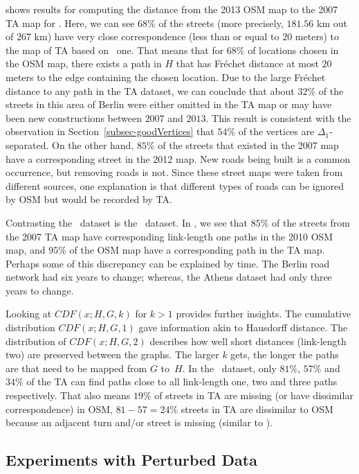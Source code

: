  shows results for computing the distance from
the 2013 OSM map to the 2007 TA map for \bsmall.  Here, we can see $68\%$ of the
streets (more precisely, $181.56$ km out of
$267$ km) have very close correspondence (less than or equal
 to $20$ meters) to
the map of TA based on \length\ one.
That means that for $68\%$ of  locations chosen in the OSM map, there exists a
path in $H$ that has Fr\'echet distance 
at most $20$ meters to the edge containing the chosen location.  Due to the 
large
Fr\'echet distance 
to any path in the TA
dataset, we can conclude that about $32\%$ of the streets in this area of Berlin
were either omitted in the TA map or
may have been new constructions between $2007$ and $2013$.
This result is
consistent with the observation in Section~\ref{subsec-goodVertices} that
$54\%$ 
of the vertices are $\Delta_1$-separated.
On the other
hand,  $85\%$  of the streets that existed in the 2007 map have a
corresponding street in the 2012 map.  New
roads being built is a common 
occurrence, but removing roads is not.  Since these
street maps were taken from different sources, one explanation is that
different types of roads can be ignored by OSM
but would be recorded by TA.



Contrasting the \bsmall\ dataset is the \asmall\ dataset.  In \asmall, we see
that $85\%$ of the streets from the 2007
TA map have corresponding link-length one paths in the 2010 OSM map, and $95\%$
of the OSM map
have a corresponding path in the TA map. Perhaps some of this discrepancy
can be explained by time.  The Berlin
road network had six years to change; whereas, the Athens dataset had only three
years to change.

Looking at $CDF(x;H,G,k)$ for $k>1$ provides further insights.  The cumulative
distribution $CDF(x;H,G,1)$ gave
information akin to Hausdorff distance.  The distribution of $CDF(x;H,G,2)$
describes how well short distances (link-length two) are preserved between the 
graphs.  The larger $k$ gets, the longer
the paths are that need to be mapped from
$G$ to~$H$.  In the \blarge\ dataset, only $81\%$, $57\%$ and $34\%$ of the TA 
can find paths close to all
link-length one, two and three paths respectively. That also means $19\%$ of streets in TA
are missing (or have dissimilar correspondence) in OSM, $81-57=24\%$ streets in TA are dissimilar 
to OSM  because an adjacent turn and/or street is missing (similar to ).


\subsection{Experiments with Perturbed Data}
\label{subsec-controlled}


